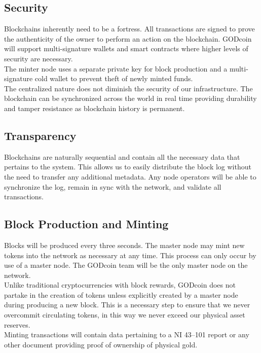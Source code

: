 \documentclass[12pt,a4paper]{article}
\begin{document}
  \subsection{Security}
  Blockchains inherently need to be a fortress. All transactions are signed to
  prove the authenticity of the owner to perform an action on the blockchain.
  GODcoin will support multi-signature wallets and smart contracts where higher
  levels of security are necessary.\\

  The minter node uses a separate private key for block production and a
  multi-signature cold wallet to prevent theft of newly minted funds.\\

  The centralized nature does not diminish the security of our infrastructure.
  The blockchain can be synchronized across the world in real time providing
  durability and tamper resistance as blockchain history is permanent.

  \subsection{Transparency}
  Blockchains are naturally sequential and contain all the necessary data that
  pertains to the system. This allows us to easily distribute the block log
  without the need to transfer any additional metadata. Any node operators will
  be able to synchronize the log, remain in sync with the network, and validate
  all transactions.

  \subsection{Block Production and Minting}
  Blocks will be produced every three seconds. The master node may mint new
  tokens into the network as necessary at any time. This process can only occur
  by use of a master node. The GODcoin team will be the only master node on the
  network.\\

  Unlike traditional cryptocurrencies with block rewards, GODcoin does not
  partake in the creation of tokens unless explicitly created by a master node
  during producing a new block. This is a necessary step to ensure that we never
  overcommit circulating tokens, in this way we never exceed our physical asset
  reserves.\\

  Minting transactions will contain data pertaining to a NI 43--101 report or
  any other document providing proof of ownership of physical gold.
\end{document}
